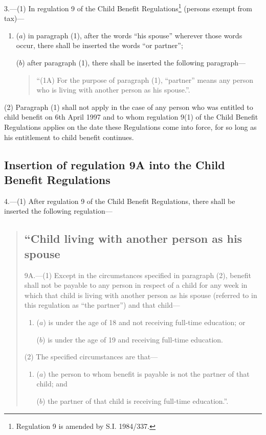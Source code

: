 \documentclass[a4paper]{article}
\newcommand\fnote[1]{\footnote{\frenchspacing #1}}
\begin{document}
3.—(1) In regulation 9 of the Child Benefit Regulations\fnote{Regulation 9 is amended by S.I. 1984/337.} (persons exempt from tax)—
\begin{enumerate}\item[]
($a$) in paragraph (1), after the words “his spouse” wherever those words occur, there shall be inserted the words “or partner”;

($b$) after paragraph (1), there shall be inserted the following paragraph—
\begin{quotation}
“(1A) For the purpose of paragraph (1), “partner” means any person who is living with another person as his spouse.”.
\end{quotation}
\end{enumerate}

(2) Paragraph (1) shall not apply in the case of any person who was entitled to child benefit on 6th April 1997 and to whom regulation 9(1) of the Child Benefit Regulations applies on the date these Regulations come into force, for so long as his entitlement to child benefit continues.

\subsection[4. Insertion of regulation 9A into the Child Benefit Regulations]{Insertion of regulation 9A into the Child Benefit Regulations}

4.—(1) After regulation 9 of the Child Benefit Regulations, there shall be inserted the following regulation—
\begin{quotation}
\subsection*{“Child living with another person as his spouse}

9A.—(1) Except in the circumstances specified in paragraph (2), benefit shall not be payable to any person in respect of a child for any week in which that child is living with another person as his spouse (referred to in this regulation as “the partner”) and that child—
\begin{enumerate}\item[]
($a$) is under the age of 18 and not receiving full-time education; or

($b$) is under the age of 19 and receiving full-time education.
\end{enumerate}

(2) The specified circumstances are that—
\begin{enumerate}\item[]
($a$) the person to whom benefit is payable is not the partner of that child; and

($b$) the partner of that child is receiving full-time education.”.
\end{enumerate}
\end{quotation}
\end{document}
